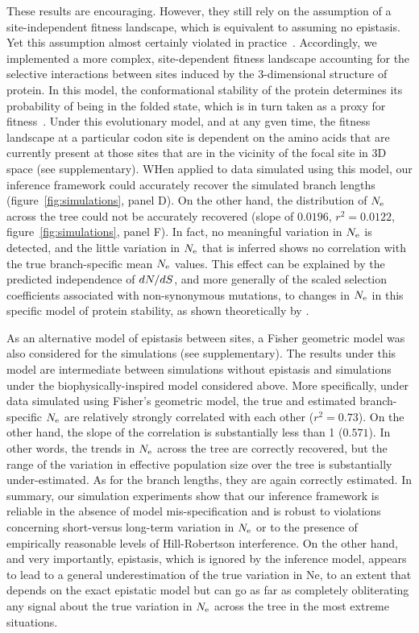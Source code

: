 \documentclass{MBE}
\begin{document}
	These results are encouraging.
	However, they still rely on the assumption of a site-independent fitness landscape, which is equivalent to assuming no epistasis.
	Yet this assumption almost certainly violated in practice~\citep{Pollock2014,Shah2015}.
	Accordingly, we implemented a more complex, site-dependent fitness landscape accounting for the selective interactions between sites induced by the 3-dimensional structure of protein.
	In this model, the conformational stability of the protein determines its probability of being in the folded state, which is in turn taken as a proxy for fitness~\citep{Williams2006, Goldstein2011, Pollock2012}.
	Under this evolutionary model, and at any gven time, the fitness landscape at a particular {codon} site is dependent on the amino acids that are currently present at those sites that are in the vicinity of the focal site in 3D space (see supplementary).
	WHen applied to data simulated using this model, our inference framework could accurately recover the simulated branch lengths (figure~\ref{fig:simulations}, panel D).
	On the other hand, the distribution of $N_{\text{e}}$ across the tree could not be accurately recovered (slope of $0.0196$, $r^2 = 0.0122$, figure~\ref{fig:simulations}, panel F).
	In fact, no meaningful variation in $N_{\text{e}}$ is detected, and the little variation in $N_{\text{e}}$ that is inferred shows no correlation with the true branch-specific mean $N_{\text{e}}$ values.
	This effect can be explained by the predicted independence of $dN/dS$, and more generally of the scaled selection coefficients associated with {non-synonymous} mutations, to changes in $N_{\text{e}}$ in this specific model of protein stability, as shown theoretically by \citet{Goldstein2013}.

	As an alternative model of epistasis between sites, a Fisher geometric model was also considered for the simulations (see supplementary).
	The results under this model are intermediate between simulations without epistasis and simulations under the biophysically-inspired model considered above.
	More specifically, under data simulated using Fisher’s geometric model, the true and estimated branch-specific $N_{\text{e}}$ are relatively strongly correlated with each other ($r^2 = 0.73$).
	On the other hand, the slope of the correlation is substantially less than 1 ($0.571$).
	In other words, the trends in $N_{\text{e}}$ across the tree are correctly recovered, but the range of the variation in {effective population size} over the tree is substantially under-estimated.
	As for the branch lengths, they are again correctly estimated.
	In summary, our simulation experiments show that our inference framework is reliable in the absence of model mis-specification and is robust to violations concerning short-versus long-term variation in $N_{\text{e}}$ or to the presence of empirically reasonable levels of Hill-Robertson interference.
	On the other hand, and very importantly, epistasis, which is ignored by the inference model, appears to lead to a general underestimation of the true variation in Ne, to an extent that depends on the exact epistatic model but can go as far as completely obliterating any signal about the true variation in $N_{\text{e}}$ across the tree in the most extreme situations.
\end{document}
